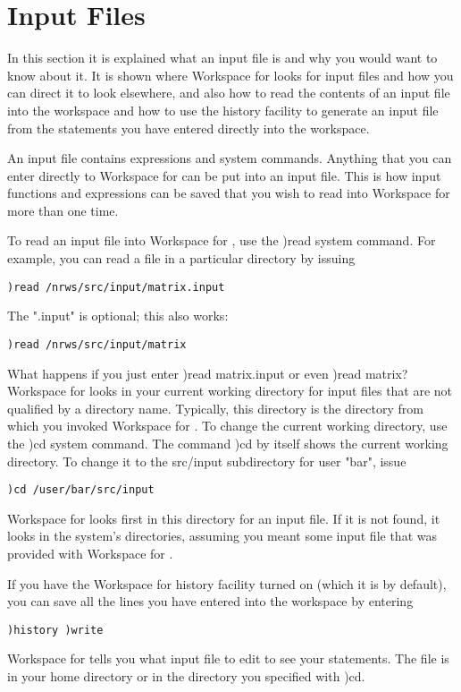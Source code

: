 \section{Input Files}

In this section it is explained what an input file is and why you
would want to know about it. It is shown where Workspace for \nr{}
looks for input files and how you can direct it to look elsewhere, and
also how to read the contents of an input file into the workspace and how to use the history facility to generate an input file from the statements you have entered directly into the workspace.

An input file contains \nr{} expressions and system commands. Anything
that you can enter directly to Workspace for \nr{} can be put into an
input file. This is how input functions and expressions can be saved that you wish to read into Workspace for \nr{} more than one time.

To read an input file into Workspace for \nr{}, use the )read system command. For example, you can read a file in a particular directory by issuing
\begin{verbatim}
)read /nrws/src/input/matrix.input
\end{verbatim}

The ".input" is optional; this also works:
\begin{verbatim}
)read /nrws/src/input/matrix
\end{verbatim}
What happens if you just enter )read matrix.input or even )read matrix? Workspace for \nr{} looks in your current working directory for input files that are not qualified by a directory name. Typically, this directory is the directory from which you invoked Workspace for \nr{}. To change the current working directory, use the )cd system command. The command )cd by itself shows the current working directory. To change it to the src/input subdirectory for user "bar", issue

\begin{verbatim}
)cd /user/bar/src/input
\end{verbatim}
Workspace for \nr{} looks first in this directory for an input file. If it is not found, it looks in the system's directories, assuming you meant some input file that was provided with Workspace for \nr{}.

If you have the Workspace for \nr{} history facility turned on (which it is by default), you can save all the lines you have entered into the workspace by entering
\begin{verbatim}
)history )write
\end{verbatim}
Workspace for \nr{} tells you what input file to edit to see your statements. The file is in your home directory or in the directory you specified with )cd.

